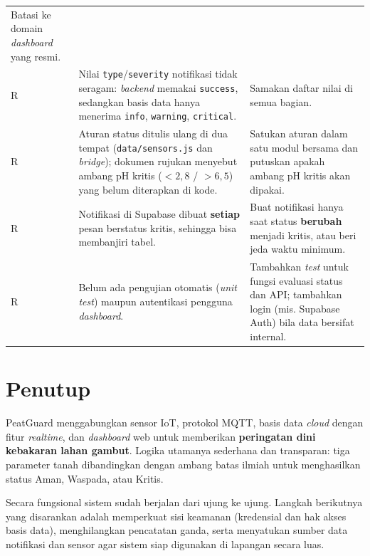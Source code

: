 \documentclass[11pt,a4paper]{article}
\newcommand{\kode}[1]{\texttt{#1}}
\begin{document}
\begin{longtable}{@{}p{0.6cm}p{4.6cm}p{8.6cm}@{}}
Batasi ke domain \textit{dashboard} yang resmi. \\
R & Nilai \kode{type}/\kode{severity} notifikasi tidak seragam: \textit{backend} memakai \kode{success}, sedangkan basis data hanya menerima \kode{info}, \kode{warning}, \kode{critical}. &
Samakan daftar nilai di semua bagian. \\
R & Aturan status ditulis ulang di dua tempat (\kode{data/sensors.js} dan \textit{bridge}); dokumen rujukan menyebut ambang pH kritis ($<2{,}8$ / $>6{,}5$) yang belum diterapkan di kode. &
Satukan aturan dalam satu modul bersama dan putuskan apakah ambang pH kritis akan dipakai. \\
R & Notifikasi di Supabase dibuat \textbf{setiap} pesan berstatus kritis, sehingga bisa membanjiri tabel. &
Buat notifikasi hanya saat status \textbf{berubah} menjadi kritis, atau beri jeda waktu minimum. \\
R & Belum ada pengujian otomatis (\textit{unit test}) maupun autentikasi pengguna \textit{dashboard}. &
Tambahkan \textit{test} untuk fungsi evaluasi status dan API; tambahkan login (mis. Supabase Auth) bila data bersifat internal. \\
\end{longtable}

\section{Penutup}

PeatGuard menggabungkan sensor IoT, protokol MQTT, basis data \textit{cloud} dengan fitur \textit{realtime},
dan \textit{dashboard} web untuk memberikan \textbf{peringatan dini kebakaran lahan gambut}.
Logika utamanya sederhana dan transparan: tiga parameter tanah dibandingkan dengan ambang batas ilmiah
untuk menghasilkan status Aman, Waspada, atau Kritis.

Secara fungsional sistem sudah berjalan dari ujung ke ujung. Langkah berikutnya yang disarankan adalah
memperkuat sisi keamanan (kredensial dan hak akses basis data), menghilangkan pencatatan ganda,
serta menyatukan sumber data notifikasi dan sensor agar sistem siap digunakan di lapangan secara luas.
\end{document}
